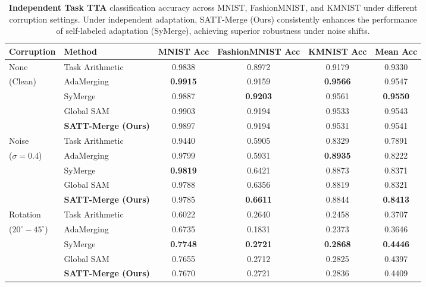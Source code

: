 \documentclass{article}
\begin{document}
\begin{table}[t]
\caption{\textbf{Independent Task TTA} classification accuracy across MNIST, FashionMNIST, and KMNIST under different corruption settings. Under independent adaptation, SATT-Merge (Ours) consistently enhances the performance of self-labeled adaptation (SyMerge), achieving superior robustness under noise shifts.}
\label{tab:independent_results}
\vskip 0.15in
\begin{center}
\begin{small}
\begin{sc}
\begin{tabular}{llcccc}
\toprule
Corruption & Method & MNIST Acc & FashionMNIST Acc & KMNIST Acc & Mean Acc \\
\midrule
None & Task Arithmetic & 0.9838 & 0.8972 & 0.9179 & 0.9330 \\
(Clean) & AdaMerging & \textbf{0.9915} & 0.9159 & \textbf{0.9566} & 0.9547 \\
 & SyMerge & 0.9887 & \textbf{0.9203} & 0.9561 & \textbf{0.9550} \\
 & Global SAM & 0.9903 & 0.9194 & 0.9533 & 0.9543 \\
 & \textbf{SATT-Merge (Ours)} & 0.9897 & 0.9194 & 0.9531 & 0.9541 \\
\midrule
Noise & Task Arithmetic & 0.9440 & 0.5905 & 0.8329 & 0.7891 \\
($\sigma=0.4$) & AdaMerging & 0.9799 & 0.5931 & \textbf{0.8935} & 0.8222 \\
 & SyMerge & \textbf{0.9819} & 0.6421 & 0.8873 & 0.8371 \\
 & Global SAM & 0.9788 & 0.6356 & 0.8819 & 0.8321 \\
 & \textbf{SATT-Merge (Ours)} & 0.9785 & \textbf{0.6611} & 0.8844 & \textbf{0.8413} \\
\midrule
Rotation & Task Arithmetic & 0.6022 & 0.2640 & 0.2458 & 0.3707 \\
($20^\circ-45^\circ$) & AdaMerging & 0.6735 & 0.1831 & 0.2373 & 0.3646 \\
 & SyMerge & \textbf{0.7748} & \textbf{0.2721} & \textbf{0.2868} & \textbf{0.4446} \\
 & Global SAM & 0.7655 & 0.2712 & 0.2825 & 0.4397 \\
 & \textbf{SATT-Merge (Ours)} & 0.7670 & 0.2721 & 0.2836 & 0.4409 \\
\bottomrule
\end{tabular}
\end{sc}
\end{small}
\end{center}
\vskip -0.1in
\end{table}
\end{document}
